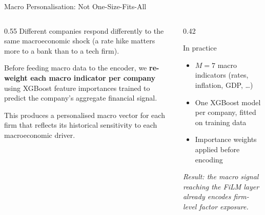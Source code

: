 \documentclass[aspectratio=169]{beamer}
\begin{document}
\begin{frame}{Macro Personalisation: Not One-Size-Fits-All}

  \begin{columns}[T]
    \begin{column}{0.55\textwidth}
      Different companies respond differently to the same macroeconomic shock
      (a rate hike matters more to a bank than to a tech firm).

      \vspace{0.8em}
      Before feeding macro data to the encoder, we \textbf{re-weight each
      macro indicator per company} using XGBoost feature importances trained
      to predict the company's aggregate financial signal.

      \vspace{0.8em}
      This produces a personalised macro vector for each firm that reflects
      its historical sensitivity to each macroeconomic driver.
    \end{column}
    \begin{column}{0.42\textwidth}
      \begin{block}{In practice}
        \begin{itemize}
          \item $M = 7$ macro indicators (rates, inflation, GDP, \ldots)
          \item One XGBoost model per company, fitted on training data
          \item Importance weights applied before encoding
        \end{itemize}
      \end{block}
      \vspace{0.5em}
      \textit{Result: the macro signal reaching the FiLM layer already
      encodes firm-level factor exposure.}
    \end{column}
  \end{columns}

\end{frame}
\end{document}
